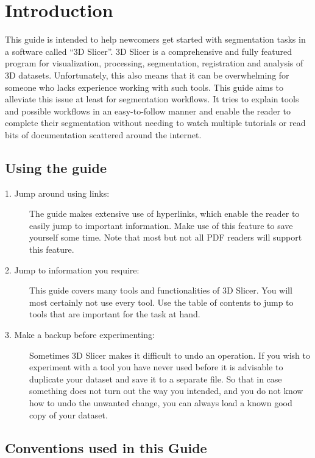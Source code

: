 
\section{Introduction}
This guide is intended to help newcomers get started with segmentation tasks in a software called ``3D Slicer''.
3D Slicer is a comprehensive and fully featured program for visualization, processing, segmentation, registration and analysis of 3D datasets.
Unfortunately, this also means that it can be overwhelming for someone who lacks experience working with such tools.
This guide aims to alleviate this issue at least for segmentation workflows.
It tries to explain tools and possible workflows in an easy-to-follow manner and enable the reader to complete their segmentation without needing to watch multiple tutorials or read bits of documentation scattered around the internet.

\subsection{Using the guide}
\begin{description}
	\item [1. Jump around using links:] The guide makes extensive use of hyperlinks, which enable the reader to easily jump to important information. Make use of this feature to save yourself some time. Note that most but not all PDF readers will support this feature.
	\item [2. Jump to information you require:] This guide covers many tools and functionalities of 3D Slicer. You will most certainly not use every tool. Use the table of contents to jump to tools that are important for the task at hand.
	\item [3. Make a backup before experimenting:] Sometimes 3D Slicer makes it difficult to undo an operation. If you wish to experiment with a tool you have never used before it is advisable to duplicate your dataset and save it to a separate file. So that in case something does not turn out the way you intended, and you do not know how to undo the unwanted change, you can always load a known good copy of your dataset.
\end{description}

\subsection{Conventions used in this Guide}

